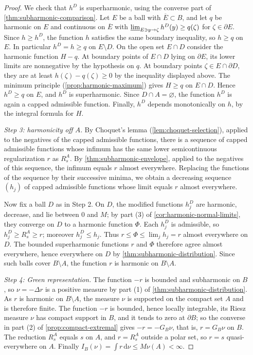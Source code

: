 \begin{proof}
We check that $h^D$ is superharmonic, using the converse part of \cref{thm:subharmonic-comparison}. Let $E$ be a ball with $\overline E\subset B$, and let $q$ be harmonic on $E$ and continuous on $\overline E$ with $\varliminf_{E\ni y\to\zeta}h^D(y)\geq q(\zeta)$ for $\zeta\in\partial E$. Since $h\geq h^D$, the function $h$ satisfies the same boundary inequality, so $h\geq q$ on $E$. In particular $h^D=h\geq q$ on $E\setminus D$. On the open set $E\cap D$ consider the harmonic function $H-q$. At boundary points of $E\cap D$ lying on $\partial E$, its lower limits are nonnegative by the hypothesis on $q$. At boundary points $\zeta\in E\cap\partial D$, they are at least $h(\zeta)-q(\zeta)\geq0$ by the inequality displayed above. The minimum principle (\cref{prop:harmonic-maximum}) gives $H\geq q$ on $E\cap D$. Hence $h^D\geq q$ on $E$, and $h^D$ is superharmonic. Since $D\cap A=\varnothing$, the function $h^D$ is again a capped admissible function. Finally, $h^D$ depends monotonically on $h$, by the integral formula for $H$.

\emph{Step 3: harmonicity off $A$.} By Choquet's lemma (\cref{lem:choquet-selection}), applied to the negatives of the capped admissible functions, there is a sequence of capped admissible functions whose infimum has the same lower semicontinuous regularization $r$ as $R_s^A$. By \cref{thm:subharmonic-envelope}, applied to the negatives of this sequence, the infimum equals $r$ almost everywhere. Replacing the functions of the sequence by their successive minima, we obtain a decreasing sequence $(h_j)$ of capped admissible functions whose limit equals $r$ almost everywhere.

Now fix a ball $D$ as in Step 2. On $D$, the modified functions $h_j^D$ are harmonic, decrease, and lie between $0$ and $M$; by part (3) of \cref{cor:harmonic-normal-limits}, they converge on $D$ to a harmonic function $\Phi$. Each $h_j^D$ is admissible, so $h_j^D\geq R_s^A\geq r$; moreover $h_j^D\leq h_j$. Thus $r\leq\Phi\leq\lim_jh_j=r$ almost everywhere on $D$. The bounded superharmonic functions $r$ and $\Phi$ therefore agree almost everywhere, hence everywhere on $D$ by \cref{thm:subharmonic-distribution}. Since such balls cover $B\setminus A$, the function $r$ is harmonic on $B\setminus A$.

\emph{Step 4: Green representation.} The function $-r$ is bounded and subharmonic on $B$, so $\nu=-\Delta r$ is a positive measure by part (1) of \cref{thm:subharmonic-distribution}. As $r$ is harmonic on $B\setminus A$, the measure $\nu$ is supported on the compact set $A$ and is therefore finite. The function $-r$ is bounded, hence locally integrable, its Riesz measure $\nu$ has compact support in $B$, and it tends to zero at $\partial B$; so the converse in part (2) of \cref{prop:compact-extremal} gives $-r=-G_B\nu$, that is, $r=G_B\nu$ on $B$. The reduction $R_s^A$ equals $s$ on $A$, and $r=R_s^A$ outside a polar set, so $r=s$ quasi-everywhere on $A$. Finally $I_B(\nu)=\int r\,\mathrm d\nu\leq M\nu(A)<\infty$.
\end{proof}

